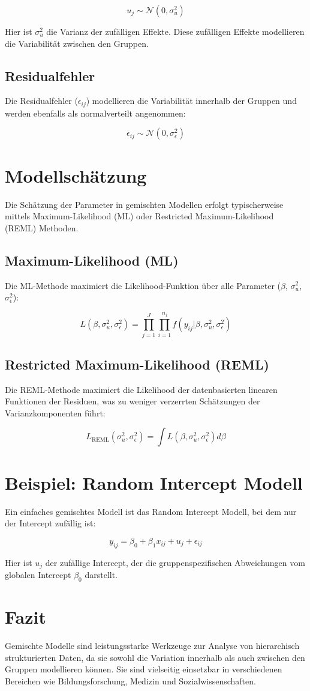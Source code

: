 \documentclass{article}
\begin{document}
	\[
	u_j \sim \mathcal{N}(0, \sigma_u^2)
	\]
	
	Hier ist \(\sigma_u^2\) die Varianz der zufälligen Effekte. Diese zufälligen Effekte modellieren die Variabilität zwischen den Gruppen.
	
	\subsection{Residualfehler}
	Die Residualfehler (\(\epsilon_{ij}\)) modellieren die Variabilität innerhalb der Gruppen und werden ebenfalls als normalverteilt angenommen:
	
	\[
	\epsilon_{ij} \sim \mathcal{N}(0, \sigma_\epsilon^2)
	\]
	
	\section{Modellschätzung}
	Die Schätzung der Parameter in gemischten Modellen erfolgt typischerweise mittels Maximum-Likelihood (ML) oder Restricted Maximum-Likelihood (REML) Methoden.
	
	\subsection{Maximum-Likelihood (ML)}
	Die ML-Methode maximiert die Likelihood-Funktion über alle Parameter (\(\beta\), \(\sigma_u^2\), \(\sigma_\epsilon^2\)):
	
	\[
	L(\beta, \sigma_u^2, \sigma_\epsilon^2) = \prod_{j=1}^{J} \prod_{i=1}^{n_j} f(y_{ij}|\beta, \sigma_u^2, \sigma_\epsilon^2)
	\]
	
	\subsection{Restricted Maximum-Likelihood (REML)}
	Die REML-Methode maximiert die Likelihood der datenbasierten linearen Funktionen der Residuen, was zu weniger verzerrten Schätzungen der Varianzkomponenten führt:
	
	\[
	L_{\text{REML}}(\sigma_u^2, \sigma_\epsilon^2) = \int L(\beta, \sigma_u^2, \sigma_\epsilon^2) d\beta
	\]
	
	\section{Beispiel: Random Intercept Modell}
	Ein einfaches gemischtes Modell ist das Random Intercept Modell, bei dem nur der Intercept zufällig ist:
	
	\[
	y_{ij} = \beta_0 + \beta_1 x_{ij} + u_{j} + \epsilon_{ij}
	\]
	
	Hier ist \( u_j \) der zufällige Intercept, der die gruppenspezifischen Abweichungen vom globalen Intercept \(\beta_0\) darstellt.
	
	\section{Fazit}
	Gemischte Modelle sind leistungsstarke Werkzeuge zur Analyse von hierarchisch strukturierten Daten, da sie sowohl die Variation innerhalb als auch zwischen den Gruppen modellieren können. Sie sind vielseitig einsetzbar in verschiedenen Bereichen wie Bildungsforschung, Medizin und Sozialwissenschaften.
	
\end{document}
